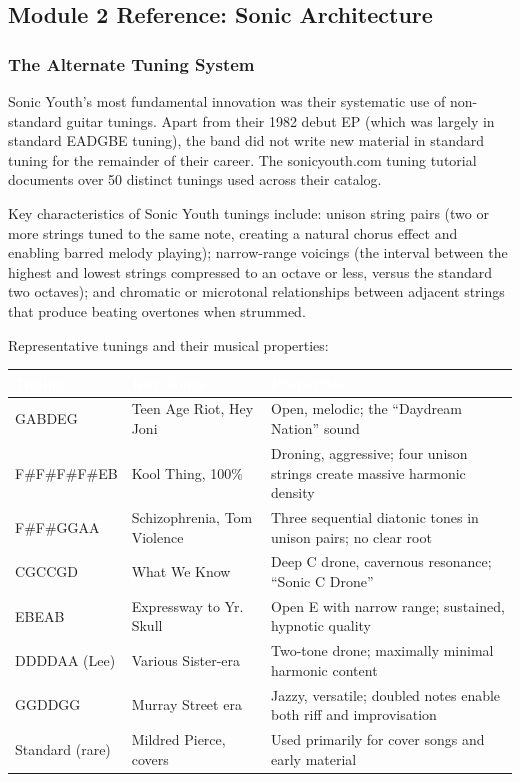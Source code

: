 \documentclass[11pt,letterpaper]{article}
\newcommand{\tableheader}[1]{\textbf{\sffamily\textcolor{white}{#1}}}
\begin{document}
\subsection{Module 2 Reference: Sonic Architecture}

\subsubsection{The Alternate Tuning System}

Sonic Youth's most fundamental innovation was their systematic use of non-standard guitar tunings. Apart from their 1982 debut EP (which was largely in standard EADGBE tuning), the band did not write new material in standard tuning for the remainder of their career. The sonicyouth.com tuning tutorial documents over 50 distinct tunings used across their catalog.

Key characteristics of Sonic Youth tunings include: unison string pairs (two or more strings tuned to the same note, creating a natural chorus effect and enabling barred melody playing); narrow-range voicings (the interval between the highest and lowest strings compressed to an octave or less, versus the standard two octaves); and chromatic or microtonal relationships between adjacent strings that produce beating overtones when strummed.

Representative tunings and their musical properties:

\begin{center}
\begin{tabularx}{\textwidth}{L{3cm}L{2.5cm}X}
\toprule
{}
\tableheader{Tuning} & \tableheader{Key Songs} & \tableheader{Properties} \\
\midrule
GABDEG & Teen Age Riot, Hey Joni & Open, melodic; the ``Daydream Nation'' sound \\
F\#F\#F\#F\#EB & Kool Thing, 100\% & Droning, aggressive; four unison strings create massive harmonic density \\
F\#F\#GGAA & Schizophrenia, Tom Violence & Three sequential diatonic tones in unison pairs; no clear root \\
CGCCGD & What We Know & Deep C drone, cavernous resonance; ``Sonic C Drone'' \\
EBEAB & Expressway to Yr. Skull & Open E with narrow range; sustained, hypnotic quality \\
DDDDAA (Lee) & Various Sister-era & Two-tone drone; maximally minimal harmonic content \\
GGDDGG & Murray Street era & Jazzy, versatile; doubled notes enable both riff and improvisation \\
Standard (rare) & Mildred Pierce, covers & Used primarily for cover songs and early material \\
\bottomrule
\end{tabularx}
\end{center}
\end{document}
